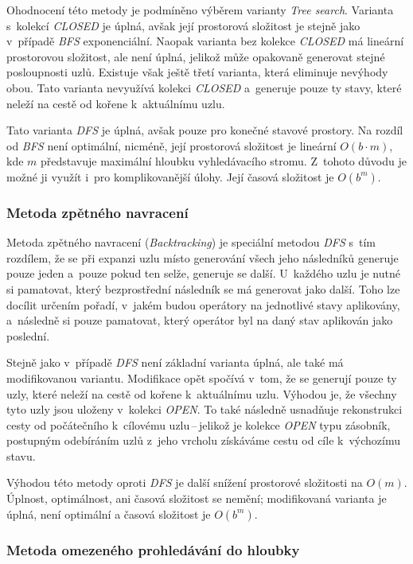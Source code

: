 Ohodnocení této metody je podmíněno výběrem varianty \emph{Tree search}. Varianta s~kolekcí \emph{CLOSED} je úplná, avšak její prostorová složitost je stejně jako v~případě \emph{BFS} exponenciální. Naopak varianta bez kolekce \emph{CLOSED} má lineární prostorovou složitost, ale není úplná, jelikož může opakovaně generovat stejné posloupnosti uzlů. Existuje však ještě třetí varianta, která eliminuje nevýhody obou. Tato varianta nevyužívá kolekci \emph{CLOSED} a~generuje pouze ty stavy, které neleží na cestě od kořene k~aktuálnímu uzlu.

Tato varianta \emph{DFS} je úplná, avšak pouze pro konečné stavové prostory. Na rozdíl od \emph{BFS} není optimální, nicméně, její prostorová složitost je lineární $O(b \cdot m)$, kde $m$ představuje maximální hloubku vyhledávacího stromu. Z~tohoto důvodu je možné ji využít i~pro komplikovanější úlohy. Její časová složitost je $O(b^m)$.

\subsubsection*{Metoda zpětného navracení}

Metoda zpětného navracení (\emph{Backtracking}) \cite{AI_Russel_Norvig} je speciální metodou \emph{DFS} s~tím rozdílem, že se při expanzi uzlu místo generování všech jeho následníků generuje pouze jeden a~pouze pokud ten selže, generuje se další. U~každého uzlu je nutné si pamatovat, který bezprostřední následník se má generovat jako další. Toho lze docílit určením pořadí, v~jakém budou operátory na jednotlivé stavy aplikovány, a~následně si pouze pamatovat, který operátor byl na daný stav aplikován jako poslední.

Stejně jako v~případě \emph{DFS} není základní varianta úplná, ale také má modifikovanou variantu. Modifikace opět spočívá v~tom, že se generují pouze ty uzly, které neleží na cestě od kořene k~aktuálnímu uzlu. Výhodou je, že všechny tyto uzly jsou uloženy v~kolekci \emph{OPEN}. To také následně usnadňuje rekonstrukci cesty od počátečního k~cílovému uzlu\,--\,jelikož je kolekce \emph{OPEN} typu zásobník, postupným odebíráním uzlů z~jeho vrcholu získáváme cestu od cíle k~výchozímu stavu.

Výhodou této metody oproti \emph{DFS} je další snížení prostorové složitosti na $O(m)$. Úplnost, optimálnost, ani časová složitost se nemění; modifikovaná varianta je úplná, není optimální a časová složitost je $O(b^m)$.

\subsubsection*{Metoda omezeného prohledávání do hloubky}

